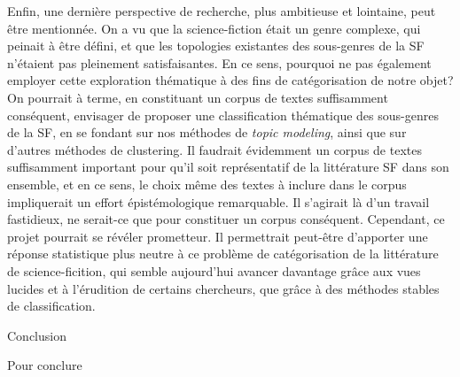 \documentclass[letterpaper,portrait,12pt]{article}
\begin{document}
\textbf{	}Enfin, une derni\`{e}re perspective de recherche, plus ambitieuse et lointaine, peut \^{e}tre mentionn\'{e}e. On a vu que la science-fiction \'{e}tait un genre complexe, qui peinait \`{a} \^{e}tre d\'{e}fini, et que les topologies existantes des sous-genres de la SF n'\'{e}taient pas pleinement satisfaisantes. En ce sens, pourquoi ne pas \'{e}galement employer cette exploration th\'{e}matique \`{a} des fins de cat\'{e}gorisation de notre objet? On pourrait \`{a} terme, en constituant un corpus de textes suffisamment cons\'{e}quent, envisager de proposer une classification th\'{e}matique des sous-genres de la SF, en se fondant sur nos m\'{e}thodes de \emph{topic modeling}, ainsi que sur d'autres m\'{e}thodes de clustering. Il faudrait \'{e}videmment un corpus de textes suffisamment important pour qu'il soit repr\'{e}sentatif de la litt\'{e}rature SF dans son ensemble, et en ce sens, le choix m\^{e}me des textes \`{a} inclure dans le corpus impliquerait un effort \'{e}pist\'{e}mologique remarquable. Il s'agirait l\`{a} d'un travail fastidieux, ne serait-ce que pour constituer un corpus cons\'{e}quent. Cependant, ce projet pourrait se r\'{e}v\'{e}ler prometteur. Il permettrait peut-\^{e}tre d'apporter une r\'{e}ponse statistique plus neutre \`{a} ce probl\`{e}me de cat\'{e}gorisation de la litt\'{e}rature de science-ficition, qui semble aujourd'hui avancer davantage gr\^{a}ce aux vues lucides et \`{a} l'\'{e}rudition de certains chercheurs, que gr\^{a}ce \`{a} des m\'{e}thodes stables de classification. 































































































Conclusion





	Pour conclure
\end{document}
